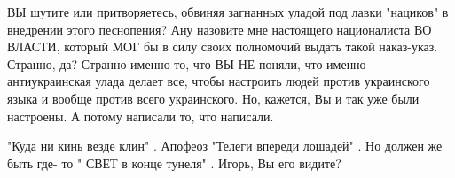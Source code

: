 \begin{itemize}

ВЫ шутите или притворяетесь, обвиняя загнанных уладой под лавки "нациков" в
внедрении этого песнопения? Ану назовите мне настоящего националиста ВО ВЛАСТИ,
который МОГ бы в силу своих полномочий выдать такой наказ-указ. Странно, да?
Странно именно то, что ВЫ НЕ поняли, что именно антиукраинская улада делает
все, чтобы настроить людей против украинского языка и вообще против всего
украинского. Но, кажется, Вы и так уже были настроены. А потому написали то,
что написали.


"Куда ни кинь везде клин" . Апофеоз "Телеги впереди лошадей" . Но должен же
быть где- то " СВЕТ в конце тунеля" . Игорь, Вы его видите?

\end{itemize} %
